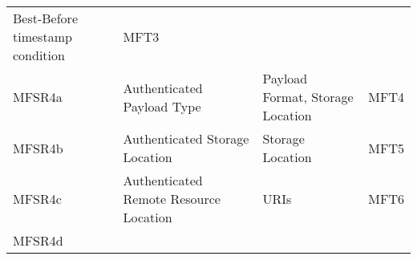 \begin{longtable}[]{@{}llll@{}}
\begin{minipage}[t]{0.34\columnwidth}
Best-Before timestamp condition\strut
\end{minipage} & \begin{minipage}[t]{0.10\columnwidth}\raggedright\strut
MFT3\strut
\end{minipage}\tabularnewline
\begin{minipage}[t]{0.16\columnwidth}\raggedright\strut
MFSR4a\strut
\end{minipage} & \begin{minipage}[t]{0.29\columnwidth}\raggedright\strut
Authenticated Payload Type\strut
\end{minipage} & \begin{minipage}[t]{0.34\columnwidth}\raggedright\strut
Payload Format, Storage Location\strut
\end{minipage} & \begin{minipage}[t]{0.10\columnwidth}\raggedright\strut
MFT4\strut
\end{minipage}\tabularnewline
\begin{minipage}[t]{0.16\columnwidth}\raggedright\strut
MFSR4b\strut
\end{minipage} & \begin{minipage}[t]{0.29\columnwidth}\raggedright\strut
Authenticated Storage Location\strut
\end{minipage} & \begin{minipage}[t]{0.34\columnwidth}\raggedright\strut
Storage Location\strut
\end{minipage} & \begin{minipage}[t]{0.10\columnwidth}\raggedright\strut
MFT5\strut
\end{minipage}\tabularnewline
\begin{minipage}[t]{0.16\columnwidth}\raggedright\strut
MFSR4c\strut
\end{minipage} & \begin{minipage}[t]{0.29\columnwidth}\raggedright\strut
Authenticated Remote Resource Location\strut
\end{minipage} & \begin{minipage}[t]{0.34\columnwidth}\raggedright\strut
URIs\strut
\end{minipage} & \begin{minipage}[t]{0.10\columnwidth}\raggedright\strut
MFT6\strut
\end{minipage}\tabularnewline
\begin{minipage}[t]{0.16\columnwidth}\raggedright\strut
MFSR4d\strut
\end{minipage} & \begin{minipage}[t]{0.29\columnwidth}\raggedright\strut

\end{minipage}
\end{longtable}
